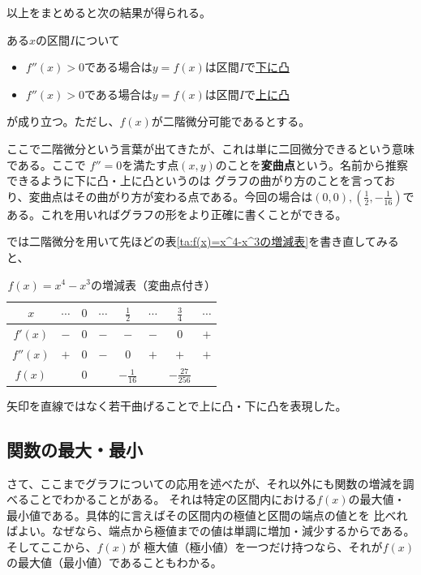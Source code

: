 \documentclass[a4j,dvipdfmx]{jsarticle}
\newcommand{\ner}{
\begin{tikzpicture}[scale=0.3,baseline=0.3]
\draw[->,>=stealth] (0,0) to[bend right=45] (1,1);
\end{tikzpicture}
}
\newcommand{\sel}{
\begin{tikzpicture}[scale=0.3,baseline=0.3]
\draw[->,>=stealth] (0,1) to[bend left=45] (1,0);
\end{tikzpicture}
}
\newcommand{\ser}{
\begin{tikzpicture}[scale=0.3,baseline=0.3]
\draw[->,>=stealth] (0,1) to[bend right=45] (1.2,0);
\end{tikzpicture}
}
\begin{document}
                    以上をまとめると次の結果が得られる。
                    \begin{screen}
                        ある$x$の区間$I$について
                        \begin{itemize}
                            \item $f''(x)>0$である場合は$y=f(x)$は区間$I$で\underline{下に凸}
                            \item $f''(x)>0$である場合は$y=f(x)$は区間$I$で\underline{上に凸}
                        \end{itemize}
                        が成り立つ。ただし、$f(x)$が二階微分可能であるとする。
                    \end{screen}
                    ここで二階微分という言葉が出てきたが、これは単に二回微分できるという意味である。ここで
                    $f''=0$を満たす点$(x,y)$のことを\textbf{変曲点}という。名前から推察できるように下に凸・上に凸というのは
                    グラフの曲がり方のことを言っており、変曲点はその曲がり方が変わる点である。今回の場合は$(0,0),(\frac{1}{2},-\frac{1}{16})$である。これを用いればグラフの形をより正確に書くことができる。

                    では二階微分を用いて先ほどの表\ref{ta:f(x)=x^4-x^3の増減表}を書き直してみると、
                    \begin{table}[h]
                        \centering
                        \begin{tabular}{|c||c|c|c|c|c|c|c|}\hline
                            $x$ & $\cdots$ & $0$ & $\cdots$ & $\frac{1}{2}$ & $\cdots$ & $\frac{3}{4}$ & $\cdots$ \\\hline
                            $f'(x)$ & $-$ & $0$ & $-$ & $-$ & $-$ & $0$ & $+$ \\\hline
                            $f''(x)$ & $+$ & $0$ & $-$ & $0$ & $+$ & $+$ & $+$ \\\hline  
                            $f(x)$ & \ser  & $0$ & \sel & $-\frac{1}{16}$ & \ser &$-\frac{27}{256}$ & \ner \\\hline
                        \end{tabular}
                        \caption{$f(x)=x^4-x^3$の増減表（変曲点付き）}\label{ta:f(x)=x^4-x^3の増減表（変曲点付き）}
                    \end{table}

                    矢印を直線ではなく若干曲げることで上に凸・下に凸を表現した。
                \clearpage
                \subsection{関数の最大・最小}
                    さて、ここまでグラフについての応用を述べたが、それ以外にも関数の増減を調べることでわかることがある。
                    それは特定の区間内における$f(x)$の最大値・最小値である。具体的に言えばその区間内の極値と区間の端点の値とを
                    比べればよい。なぜなら、端点から極値までの値は単調に増加・減少するからである。そしてここから、$f(x)$が
                    極大値（極小値）を一つだけ持つなら、それが$f(x)$の最大値（最小値）であることもわかる。\\
\end{document}
